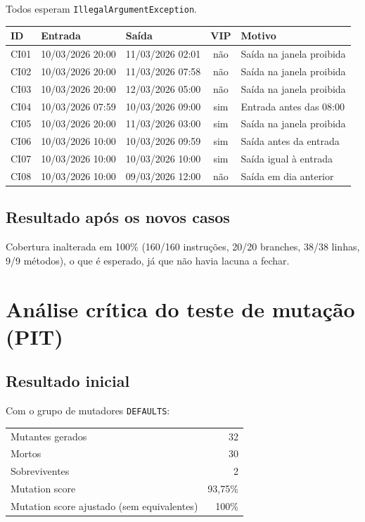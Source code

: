 \documentclass[11pt,a4paper]{article}
\begin{document}
Todos esperam \texttt{IllegalArgumentException}.

\small
\begin{longtable}{@{}l p{3.5cm} p{3.5cm} c p{4.4cm}@{}}
\toprule
ID & Entrada & Saída & VIP & Motivo \\
\midrule
\endhead
CI01 & 10/03/2026 20:00 & 11/03/2026 02:01 & não & Saída na janela proibida \\
CI02 & 10/03/2026 20:00 & 11/03/2026 07:58 & não & Saída na janela proibida \\
CI03 & 10/03/2026 20:00 & 12/03/2026 05:00 & não & Saída na janela proibida \\
CI04 & 10/03/2026 07:59 & 10/03/2026 09:00 & sim & Entrada antes das 08:00 \\
CI05 & 10/03/2026 20:00 & 11/03/2026 03:00 & sim & Saída na janela proibida \\
CI06 & 10/03/2026 10:00 & 10/03/2026 09:59 & sim & Saída antes da entrada \\
CI07 & 10/03/2026 10:00 & 10/03/2026 10:00 & sim & Saída igual à entrada \\
CI08 & 10/03/2026 10:00 & 09/03/2026 12:00 & não & Saída em dia anterior \\
\bottomrule
\end{longtable}
\normalsize

\subsection{Resultado após os novos casos}

Cobertura inalterada em 100\% (160/160 instruções, 20/20 branches, 38/38 linhas,
9/9 métodos), o que é esperado, já que não havia lacuna a fechar.

\section{Análise crítica do teste de mutação (PIT)}

\subsection{Resultado inicial}

Com o grupo de mutadores \texttt{DEFAULTS}:

\begin{center}
\begin{tabular}{lr}
\toprule
Mutantes gerados & 32 \\
Mortos & 30 \\
Sobreviventes & 2 \\
Mutation score & 93,75\% \\
Mutation score ajustado (sem equivalentes) & 100\% \\
\bottomrule
\end{tabular}
\end{center}
\end{document}
